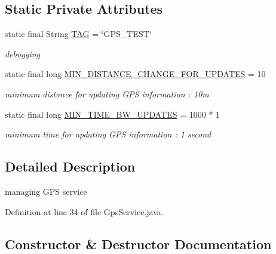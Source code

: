 \subsection*{Static Private Attributes}
\begin{DoxyCompactItemize}
\item 
static final String \mbox{\hyperlink{classhi_1_1world_1_1hello_1_1myapplication_1_1_gps_service_a22349ec7a239321d10eeac630bce141c}{T\+AG}} = \char`\"{}G\+P\+S\+\_\+\+T\+E\+ST\char`\"{}
\begin{DoxyCompactList}\small\item\em debugging \end{DoxyCompactList}\item 
static final long \mbox{\hyperlink{classhi_1_1world_1_1hello_1_1myapplication_1_1_gps_service_acd59aa0b18284b8827b66d593b339a45}{M\+I\+N\+\_\+\+D\+I\+S\+T\+A\+N\+C\+E\+\_\+\+C\+H\+A\+N\+G\+E\+\_\+\+F\+O\+R\+\_\+\+U\+P\+D\+A\+T\+ES}} = 10
\begin{DoxyCompactList}\small\item\em minimum distance for updating G\+PS information \+: 10m \end{DoxyCompactList}\item 
static final long \mbox{\hyperlink{classhi_1_1world_1_1hello_1_1myapplication_1_1_gps_service_a4505558cfb0807960b53f5e4232fee69}{M\+I\+N\+\_\+\+T\+I\+M\+E\+\_\+\+B\+W\+\_\+\+U\+P\+D\+A\+T\+ES}} = 1000 $\ast$ 1
\begin{DoxyCompactList}\small\item\em minimum time for updating G\+PS information \+: 1 second \end{DoxyCompactList}\end{DoxyCompactItemize}


\subsection{Detailed Description}
managing G\+PS service 

Definition at line 34 of file Gps\+Service.\+java.



\subsection{Constructor \& Destructor Documentation}
\mbox{\label{classhi_1_1world_1_1hello_1_1myapplication_1_1_gps_service_ae221c88a83cc05e7694bd0ca40fc9e3c}} 
